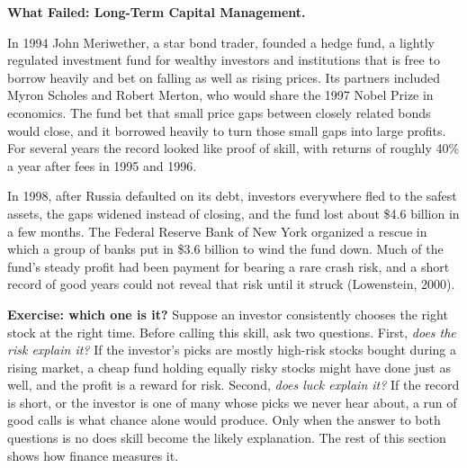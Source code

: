 \begin{callout}
\textbf{What Failed: Long-Term Capital Management.} 

In 1994 John Meriwether, a star bond trader, founded a hedge fund, a lightly regulated investment fund for wealthy investors and institutions that is free to borrow heavily and bet on falling as well as rising prices. Its partners included Myron Scholes and Robert Merton, who would share the 1997 Nobel Prize in economics. The fund bet that small price gaps between closely related bonds would close, and it borrowed heavily to turn those small gaps into large profits. For several years the record looked like proof of skill, with returns of roughly 40\% a year after fees in 1995 and 1996. 

In 1998, after Russia defaulted on its debt, investors everywhere fled to the safest assets, the gaps widened instead of closing, and the fund lost about \$4.6 billion in a few months. The Federal Reserve Bank of New York organized a rescue in which a group of banks put in \$3.6 billion to wind the fund down. Much of the fund's steady profit had been payment for bearing a rare crash risk, and a short record of good years could not reveal that risk until it struck (Lowenstein, 2000).
\end{callout}



\noindent\textbf{Exercise: which one is it?} Suppose an investor
consistently chooses the right stock at the right time. Before calling this
skill, ask two questions. First, \emph{does the risk explain it?} If the
investor's picks are mostly high-risk stocks bought during a rising market,
a cheap fund holding equally risky stocks might have done just as well, and
the profit is a reward for risk. Second, \emph{does luck explain it?} If the
record is short, or the investor is one of many whose picks we never hear
about, a run of good calls is what chance alone would produce. Only when the
answer to both questions is no does skill become the likely explanation. The
rest of this section shows how finance measures it.

